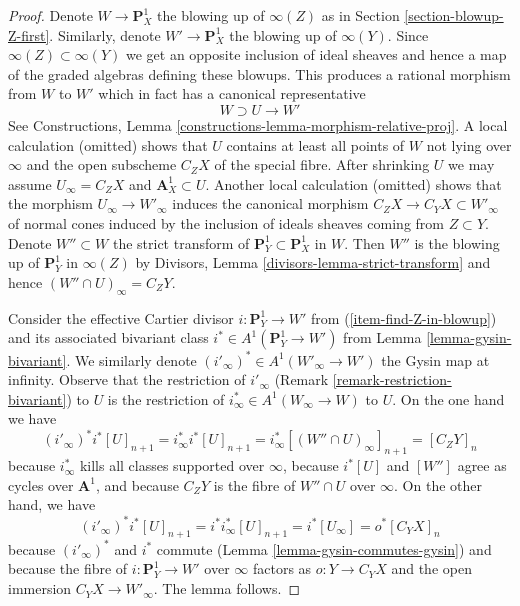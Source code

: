 \begin{proof}
Denote $W \to \mathbf{P}^1_X$ the blowing up of $\infty(Z)$ as in
Section \ref{section-blowup-Z-first}.
Similarly, denote $W' \to \mathbf{P}^1_X$ the blowing up of $\infty(Y)$.
Since $\infty(Z) \subset \infty(Y)$ we get an opposite inclusion
of ideal sheaves and hence a map of the graded algebras
defining these blowups. This produces a rational morphism from $W$
to $W'$ which in fact has a canonical representative
$$
W \supset U \longrightarrow W'
$$
See Constructions, Lemma \ref{constructions-lemma-morphism-relative-proj}.
A local calculation (omitted) shows that $U$ contains at least all points
of $W$ not lying over $\infty$ and the open subscheme $C_Z X$ of the special
fibre. After shrinking $U$ we may assume $U_\infty = C_Z X$ and
$\mathbf{A}^1_X \subset U$. Another local calculation (omitted)
shows that the morphism $U_\infty \to W'_\infty$
induces the canonical morphism $C_Z X \to C_Y X \subset W'_\infty$
of normal cones induced by the inclusion of ideals sheaves
coming from $Z \subset Y$. Denote $W'' \subset W$ the strict transform of
$\mathbf{P}^1_Y \subset \mathbf{P}^1_X$ in $W$. Then $W''$ is the blowing
up of $\mathbf{P}^1_Y$ in $\infty(Z)$ by
Divisors, Lemma \ref{divisors-lemma-strict-transform}
and hence $(W'' \cap U)_\infty = C_ZY$.

\medskip\noindent
Consider the effective Cartier divisor $i : \mathbf{P}^1_Y \to W'$
from (\ref{item-find-Z-in-blowup}) and its associated bivariant class
$i^* \in A^1(\mathbf{P}^1_Y \to W')$ from Lemma \ref{lemma-gysin-bivariant}.
We similarly denote $(i'_\infty)^* \in A^1(W'_\infty \to W')$ the
Gysin map at infinity. Observe that the restriction of $i'_\infty$
(Remark \ref{remark-restriction-bivariant}) to $U$ is the restriction of
$i_\infty^* \in A^1(W_\infty \to W)$ to $U$. On the one hand we have
$$
(i'_\infty)^* i^* [U]_{n + 1} =
i_\infty^* i^* [U]_{n + 1} =
i_\infty^* [(W'' \cap U)_\infty]_{n + 1} =
[C_ZY]_n
$$
because $i_\infty^*$ kills all classes supported over $\infty$, because
$i^*[U]$ and $[W'']$ agree as cycles over $\mathbf{A}^1$, and because
$C_ZY$ is the fibre of $W'' \cap U$ over $\infty$.
On the other hand, we have
$$
(i'_\infty)^* i^* [U]_{n + 1} =
i^* i_\infty^*[U]_{n + 1} =
i^* [U_\infty] =
o^*[C_YX]_n
$$
because $(i'_\infty)^*$ and $i^*$ commute
(Lemma \ref{lemma-gysin-commutes-gysin})
and because the fibre of $i : \mathbf{P}^1_Y \to W'$ over $\infty$
factors as $o : Y \to C_YX$ and the open immersion $C_YX \to W'_\infty$.
The lemma follows.
\end{proof}

